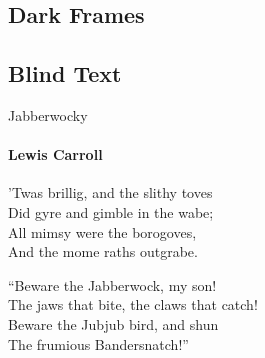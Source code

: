 \documentclass{beamer}
\begin{document}
\begin{darkframes}
  	
  	
  	
  	
  	
  	
  	
  	
  	
  	
  	
  	
  	
  	
  	
  	
  	
 
    \section{Dark Frames}
    \subsection{Blind Text}
    \begin{frame}{Jabberwocky}
      \framesubtitle{Lewis Carroll}%
      'Twas brillig, and the slithy toves\\
      Did gyre and gimble in the wabe;\\
      All mimsy were the borogoves,\\
      And the mome raths outgrabe.\\\bigskip

      “Beware the Jabberwock, my son!\\
      The jaws that bite, the claws that catch!\\
      Beware the Jubjub bird, and shun\\
      The frumious Bandersnatch!”\\
    \end{frame}


\end{darkframes}
\end{document}
